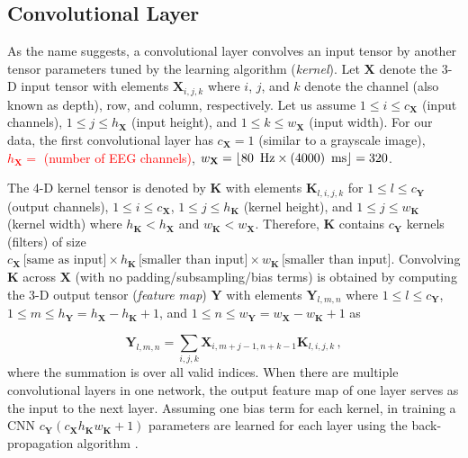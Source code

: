 \documentclass{ieeeaccess}
\begin{document}
\subsection{Convolutional Layer} \label{ConvNetsec}
As the name suggests, a convolutional layer convolves an input tensor by another tensor parameters tuned by the learning algorithm (\textit{kernel}). Let $\mathbf{\mathbf{X}}$ denote the 3-D input tensor with elements $\mathbf{\mathbf{X}}_{i, j, k}$ where $i$, $j$, and $k$ denote the channel (also known as depth), row, and column, respectively. Let us assume $1\leq i \leq c_{\mathbf{X}}$ (input channels),  $1\leq j \leq h_{\mathbf{X}}$ (input height),  and $1\leq k \leq w_{\mathbf{X}}$ (input width). For our data, the first convolutional layer has $c_{\mathbf{X}}=1$ (similar to a grayscale image),  \textcolor{red}{$h_{\mathbf{X}}=$ (number of EEG channels)},  $w_{\mathbf{X}}=\lfloor 80\text{\, Hz} \times (4000) \text{\, ms} \rfloor=320$. 
    
The 4-D kernel tensor is denoted by $\mathbf{\mathbf{K}}$ with elements $\mathbf{\mathbf{K}}_{l, i, j, k}$ for $1\leq l \leq c_{\mathbf{Y}}$ (output channels),  $1\leq i \leq c_{\mathbf{X}}$,  $1\leq j \leq h_{\mathbf{K}}$ (kernel height),  and $1\leq j \leq w_{\mathbf{K}}$ (kernel width) where $h_{\mathbf{K}}< h_{\mathbf{X}}$ and $w_{\mathbf{K}}< w_{\mathbf{X}}$. Therefore, $\mathbf{\mathbf{K}}$ contains $c_{\mathbf{Y}}$ kernels (filters) of size $c_{\mathbf{X}}\, \text{[same as input]} \times h_{\mathbf{K}}\, \text{[smaller than input]} \times w_{\mathbf{K}} \, \text{[smaller than input]}$. Convolving $\mathbf{\mathbf{K}}$ across $\mathbf{\mathbf{X}}$ (with no padding/subsampling/bias terms) is obtained by computing the 3-D output tensor (\textit{feature map}) $\mathbf{\mathbf{Y}}$ with elements $\mathbf{\mathbf{Y}}_{l, m, n}$ where $1\leq l \leq c_{\mathbf{Y}}$,  $1\leq m \leq h_{\mathbf{Y}} = h_{\mathbf{X}}-h_{\mathbf{K}}+1$,  and $1\leq n \leq w_{\mathbf{Y}} = w_{\mathbf{X}}-w_{\mathbf{K}}+1$ as 
    
    \begin{equation}
    \mathbf{\mathbf{Y}}_{l, m, n} = \sum_{i, j, k} \mathbf{\mathbf{X}}_{i, m+j-1, n+k-1} \mathbf{\mathbf{K}}_{l, i, j, k}\, , 
    \label{observations}
    \end{equation}
    where the summation is over all valid indices. When there are multiple convolutional layers in one network,  the output feature map of one layer serves as the input to the next layer. Assuming one bias term for each kernel, in training a CNN $c_{\mathbf{Y}} (c_{\mathbf{X}}  h_{\mathbf{K}} w_{\mathbf{K}} + 1)$ parameters are learned for each layer using the back-propagation algorithm \cite{witten17}.
    
\end{document}
